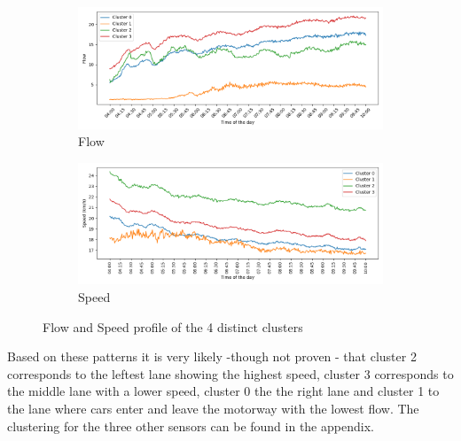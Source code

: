 	\begin{figure}[H]
		\centering
		\begin{subfigure}{0.49 \linewidth}
			\includegraphics[width=\textwidth]{../Plots/Flow/clustering_5portals}
			\caption{Flow}
		\end{subfigure}
		\begin{subfigure}{0.49 \linewidth}
			\includegraphics[width=\textwidth]{../Plots/Speed/clustering_5portals}
			\caption{Speed}
		\end{subfigure}
		\caption{Flow and Speed profile of the 4 distinct clusters}
		\label{fig:clustering_5portals}
	\end{figure}
	\noindent Based on these patterns it is very likely -though not proven - that cluster 2 corresponds to the leftest lane showing the highest speed, cluster 3 corresponds to the middle lane with a lower speed, cluster 0 the the right lane and cluster 1 to the lane where cars enter and leave the motorway with the lowest flow.
	The clustering for the three other sensors can be found in the appendix.

